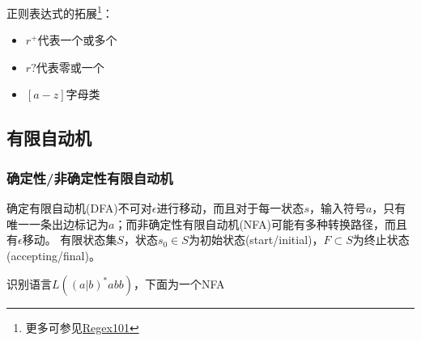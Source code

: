 正则表达式的拓展\footnote{更多可参见\href{https://regex101.com/}{Regex101}}：
\begin{itemize}
	\item $r^+$代表一个或多个
	\item $r?$代表零或一个
	\item $[a-z]$字母类
\end{itemize}

\subsection{有限自动机}
\subsubsection{确定性/非确定性有限自动机}
确定有限自动机(DFA)不可对$\epsilon$进行移动，而且对于每一状态$s$，输入符号$a$，只有唯一一条出边标记为$a$；而非确定性有限自动机(NFA)可能有多种转换路径，而且有$\epsilon$移动。
有限状态集$S$，状态$s_0\in S$为初始状态(start/initial)，$F\subset S$为终止状态(accepting/final)。
\begin{example}
识别语言$L((a|b)^*abb)$，下面为一个NFA
\begin{center}
\end{center}
\end{example}

